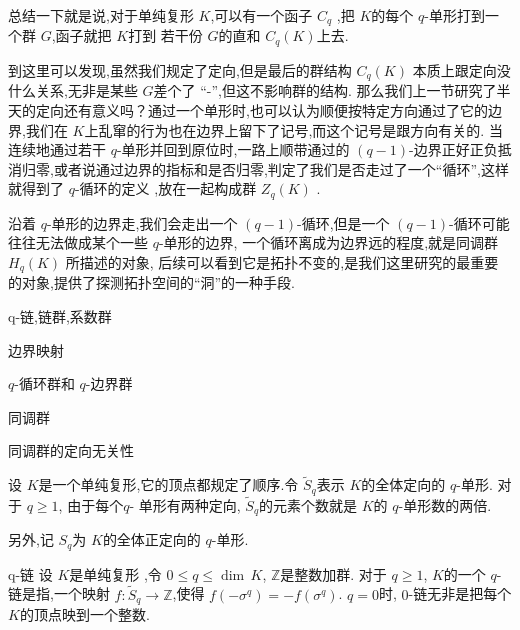 \documentclass[../../几何与拓扑.tex]{subfiles}
\begin{document}
总结一下就是说,对于单纯复形 \(  K  \),可以有一个函子 \(  C_{q}  \) ,把 \(  K  \)的每个 \(  q  \)-单形打到一个群 \(  G  \),函子就把 \( K   \)打到 若干份 \(  G  \)的直和 \(  C_{q}\left( K \right)   \)上去.       

到这里可以发现,虽然我们规定了定向,但是最后的群结构 \(  C_{q}\left( K \right)   \) 本质上跟定向没什么关系,无非是某些  \(  G  \)差个了 “-”,但这不影响群的结构. 
那么我们上一节研究了半天的定向还有意义吗？通过一个单形时,也可以认为顺便按特定方向通过了它的边界,我们在 \(  K  \)上乱窜的行为也在边界上留下了记号,而这个记号是跟方向有关的.
当连续地通过若干 \(  q  \)-单形并回到原位时,一路上顺带通过的 \(  \left( q-1 \right)   \)-边界正好正负抵消归零,或者说通过边界的指标和是否归零,判定了我们是否走过了一个“循环”,这样就得到了 \(  q  \)-循环的定义 ,放在一起构成群 \(  Z_{q}\left( K \right)   \) . 

沿着 \(  q  \)-单形的边界走,我们会走出一个 \(  \left( q-1 \right)   \)-循环,但是一个 \(  \left( q-1 \right)   \)-循环可能往往无法做成某个一些 \(  q  \)-单形的边界,
一个循环离成为边界远的程度,就是同调群 \(  H_{q}\left( K \right)   \) 所描述的对象,     后续可以看到它是拓扑不变的,是我们这里研究的最重要的对象,提供了探测拓扑空间的“洞”的一种手段.

\begin{introduction}
    \item q-链,链群,系数群
    \item 边界映射
    \item \(  q  \)-循环群和 \(  q  \)-边界群
    \item 同调群
    \item 同调群的定向无关性  
\end{introduction}


\begin{definition}
    设 \(  K  \)是一个单纯复形,它的顶点都规定了顺序.令 \(  \tilde{S}_{q}  \)表示 \(  K  \)的全体定向的 \(  q  \)-单形.  
    对于 \(  q\ge 1  \), 由于每个\(  q  \)- 单形有两种定向, \(  \tilde{S}_{q}  \)的元素个数就是 \(  K  \)的 \(  q  \)-单形数的两倍.
    
    另外,记 \(  S_{q}  \)为 \(  K  \)的全体正定向的 \(  q  \)-单形.  
\end{definition}

\begin{definition}{q-链}
    设 \(  K  \)是单纯复形 ,令 \(  0\le q\le \operatorname{dim}\,K  \), \(  \mathbb{Z}   \)是整数加群.
    对于 \(  q\ge 1  \),  \(  K  \)的一个 \(  q  \)-链是指,一个映射 \(  f: \tilde{S}_{q}\to \mathbb{Z}   \),使得 \(  f\left( - \sigma ^{q} \right)= - f\left(  \sigma ^{q} \right)   \).
     \(  q= 0  \)时,  \(  0  \)-链无非是把每个 \(  K  \)的顶点映到一个整数.        
\end{definition}
\end{document}
